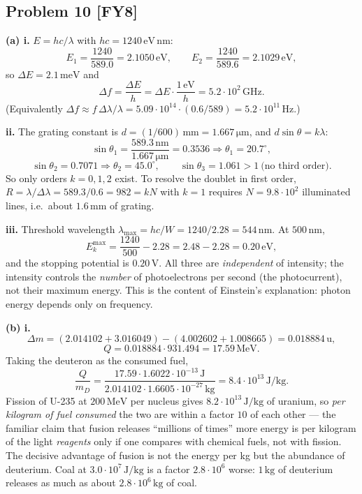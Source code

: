 \documentclass[11pt,a4paper]{article}
\newcommand{\problem}[2]{\subsection*{Problem #1 \; \textnormal{\small[#2]}}}
\newcommand{\unit}[1]{\,\mathrm{#1}}
\begin{document}
\problem{10}{FY8}
\textbf{(a) i.} $E=hc/\lambda$ with $hc=1240\unit{eV\,nm}$:
\[
  E_1=\frac{1240}{589.0}=2.1050\unit{eV},\qquad
  E_2=\frac{1240}{589.6}=2.1029\unit{eV},
\]
so $\Delta E=2.1\unit{meV}$ and
\[
  \Delta f=\frac{\Delta E}{h}=\Delta E\cdot\frac{1\unit{eV}}{h}
  =\boxed{5.2\cdot10^{2}\unit{GHz}}.
\]
(Equivalently $\Delta f\approx f\,\Delta\lambda/\lambda
=5.09\cdot10^{14}\cdot(0.6/589)=5.2\cdot10^{11}\unit{Hz}$.)

\textbf{ii.} The grating constant is
$d=(1/600)\unit{mm}=1.667\unit{\mu m}$, and $d\sin\theta=k\lambda$:
\[
  \sin\theta_1=\frac{589.3\unit{nm}}{1.667\unit{\mu m}}=0.3536
  \Rightarrow\theta_1=20.7^\circ,
\]
\[
  \sin\theta_2=0.7071\Rightarrow\theta_2=45.0^\circ,\qquad
  \sin\theta_3=1.061>1\ \text{(no third order)} .
\]
So only orders $k=0,1,2$ exist. To resolve the doublet in first order,
$R=\lambda/\Delta\lambda=589.3/0.6=982=kN$ with $k=1$ requires
$N=\boxed{9.8\cdot10^{2}}$ illuminated lines, i.e.\ about
$1.6\unit{mm}$ of grating.

\textbf{iii.} Threshold wavelength
$\lambda_{\max}=hc/W=1240/2.28=\boxed{544\unit{nm}}$. At $500\unit{nm}$,
\[
  E_k^{\max}=\frac{1240}{500}-2.28=2.48-2.28=\boxed{0.20\unit{eV}},
\]
and the stopping potential is $\boxed{0.20\unit{V}}$. All three are
\emph{independent} of intensity; the intensity controls the \emph{number}
of photoelectrons per second (the photocurrent), not their maximum energy.
This is the content of Einstein's explanation: photon energy depends only
on frequency.

\textbf{(b) i.}
\[
  \Delta m=(2.014102+3.016049)-(4.002602+1.008665)
  =0.018884\unit{u},
\]
\[
  Q=0.018884\cdot931.494=\boxed{17.59\unit{MeV}} .
\]
Taking the deuteron as the consumed fuel,
\[
  \frac{Q}{m_D}
  =\frac{17.59\cdot1.6022\cdot10^{-13}\unit{J}}
         {2.014102\cdot1.6605\cdot10^{-27}\unit{kg}}
  =\boxed{8.4\cdot10^{13}\unit{J/kg}} .
\]
Fission of U-235 at $200\unit{MeV}$ per nucleus gives
$8.2\cdot10^{13}\unit{J/kg}$ of uranium, so \emph{per kilogram of fuel
consumed} the two are within a factor $10$ of each other --- the familiar
claim that fusion releases ``millions of times'' more energy is per kilogram
of the light \emph{reagents} only if one compares with chemical fuels, not
with fission. The decisive advantage of fusion is not the energy per kg but
the abundance of deuterium. Coal at $3.0\cdot10^{7}\unit{J/kg}$ is a factor
$2.8\cdot10^{6}$ worse: $1\unit{kg}$ of deuterium releases as much as about
$2.8\cdot10^{6}\unit{kg}$ of coal.
\end{document}
